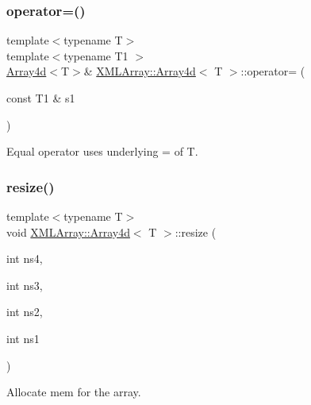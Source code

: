 \subsubsection{\texorpdfstring{operator=()}{operator=()}\hspace{0.1cm}{\footnotesize\ttfamily [4/4]}}
{\footnotesize\ttfamily template$<$typename T$>$ \\
template$<$typename T1 $>$ \\
\mbox{\hyperlink{classXMLArray_1_1Array4d}{Array4d}}$<$T$>$\& \mbox{\hyperlink{classXMLArray_1_1Array4d}{X\+M\+L\+Array\+::\+Array4d}}$<$ T $>$\+::operator= (\begin{DoxyParamCaption}\item[{const T1 \&}]{s1 }\end{DoxyParamCaption})\hspace{0.3cm}{\ttfamily [inline]}}



Equal operator uses underlying = of T. 

\mbox{\label{classXMLArray_1_1Array4d_a8726b8005ecb501662b5e76873702480}} 
\subsubsection{\texorpdfstring{resize()}{resize()}\hspace{0.1cm}{\footnotesize\ttfamily [1/2]}}
{\footnotesize\ttfamily template$<$typename T$>$ \\
void \mbox{\hyperlink{classXMLArray_1_1Array4d}{X\+M\+L\+Array\+::\+Array4d}}$<$ T $>$\+::resize (\begin{DoxyParamCaption}\item[{int}]{ns4,  }\item[{int}]{ns3,  }\item[{int}]{ns2,  }\item[{int}]{ns1 }\end{DoxyParamCaption})\hspace{0.3cm}{\ttfamily [inline]}}



Allocate mem for the array. 

\mbox{\label{classXMLArray_1_1Array4d_a8726b8005ecb501662b5e76873702480}} 
